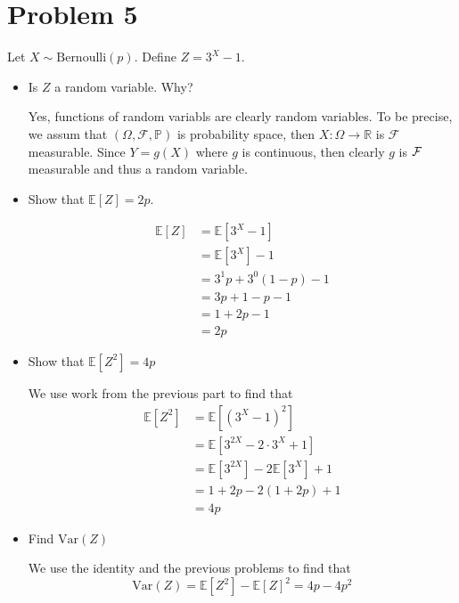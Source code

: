 \documentclass[11pt]{article}
\newcommand{\Var}{\text{Var}}
\newcommand{\bbE}{\mathbb{E}}
\newcommand{\bbP}{\mathbb{P}}
\newcommand{\bbR}{\mathbb{R}}
\begin{document}
\section*{Problem 5}
\begin{problem}
    Let $X \sim \text{Bernoulli}(p).$ Define $Z = 3^X -1.$ 
\begin{itemize}
    \item Is $Z$ a random variable. Why?
    \begin{solution}
        Yes, functions of random variabls are clearly random variables. To be precise, we assum that $(\Omega, \mathcal{F}, \bbP)$ is probability space, then $X: \Omega \to \bbR$ is $\mathcal{F}$ measurable. Since $Y = g(X)$ where $g$ is continuous, then clearly $g$ is $\cal F$ measurable and thus a random variable.
    \end{solution}
    \item Show that $\bbE[Z] = 2p.$
    \begin{solution}
        \begin{align*}
            \bbE[Z] &= \bbE[3^X -1]\\
            &= \bbE[3^X] -1\\
            &= 3^1 p + 3^0 (1-p) - 1\\
            &= 3p + 1 - p -1 \\
            &= 1+2p -1 \\
            &= \boxed{2p}
        \end{align*}
    \end{solution}
    \item Show that $\bbE[Z^2] = 4p$
    \begin{solution}
    We use work from the previous part to find that
        \begin{align*}
            \bbE[Z^2] &= \bbE[(3^X -1)^2]\\
            &= \bbE[3^{2X} - 2\cdot 3^X + 1]\\
            &= \bbE[3^{2X}] - 2\bbE[3^X] +1\\
            &= 1+2p- 2(1+2p) + 1\\
            &= \boxed{4p}
        \end{align*}
    \end{solution}
    \item 
    Find $\Var(Z)$
    \begin{solution}
        We use the identity and the previous problems to find that
        \[\Var(Z) = \bbE[Z^2] - \bbE[Z]^2 = \boxed{4p - 4p^2}\]
    \end{solution}
\end{itemize}
\end{problem}
\end{document}
